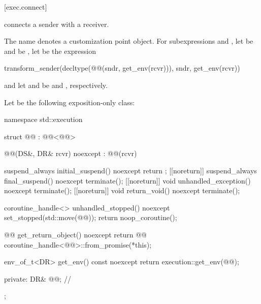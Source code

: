 [exec.connect]{}

\pnum
{} connects a sender with a receiver.

\pnum
The name  denotes a customization point object.
For subexpressions  and ,
let  be  and
 be ,
let  be the expression
\begin{codeblock}
transform_sender(decltype(@@(sndr, get_env(rcvr))){}, sndr, get_env(rcvr))
\end{codeblock}
and let  and  be
 and , respectively.

\pnum
Let  be the following exposition-only class:

\begin{codeblock}
namespace std::execution {
  struct @@ : @@<@@> {

    @@(DS&, DR& rcvr) noexcept : @@(rcvr) {}

    suspend_always initial_suspend() noexcept { return {}; }
    [[noreturn]] suspend_always final_suspend() noexcept { terminate(); }
    [[noreturn]] void unhandled_exception() noexcept { terminate(); }
    [[noreturn]] void return_void() noexcept { terminate(); }

    coroutine_handle<> unhandled_stopped() noexcept {
      set_stopped(std::move(@@));
      return noop_coroutine();
    }

    @@ get_return_object() noexcept {
      return @@{
        coroutine_handle<@@>::from_promise(*this)};
    }

    env_of_t<DR> get_env() const noexcept {
      return execution::get_env(@@);
    }

  private:
    DR& @@;                           // \expos
  };
}
\end{codeblock}

